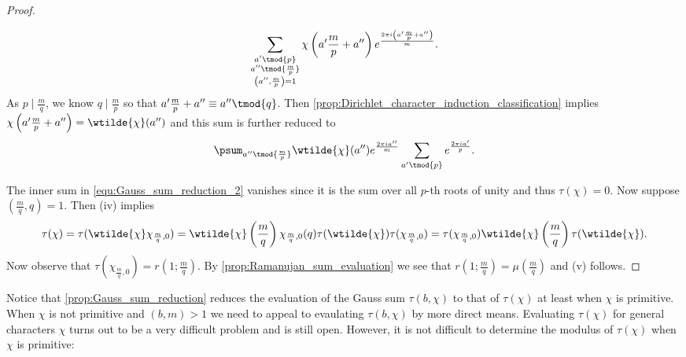 \begin{proof}
\begin{enumerate}[label=(\roman*)]
\[              \sum_{\substack{a' \tmod{p} \\ a'' \tmod{\frac{m}{p}} \\ \left(a'',\frac{m}{p}\right) = 1}}\chi\left(a'\frac{m}{p}+a''\right)e^{\frac{2\pi i\left(a'\frac{m}{p}+a''\right)}{m}}.
            \]
            As $p \mid \frac{m}{q}$, we know $q \mid \frac{m}{p}$ so that $a'\frac{m}{p}+a'' \equiv a'' \tmod{q}$. Then \cref{prop:Dirichlet_character_induction_classification} implies $\chi\left(a'\frac{m}{p}+a''\right) = \wtilde{\chi}(a'')$ and this sum is further reduced to
            \begin{equation}\label{equ:Gauss_sum_reduction_2}
              \psum_{a'' \tmod{\frac{m}{p}}}\wtilde{\chi}(a'')e^{\frac{2\pi ia''}{m}}\sum_{a' \tmod{p}}e^{\frac{2\pi ia'}{p}}.
            \end{equation}
          \end{enumerate}
          The inner sum in \cref{equ:Gauss_sum_reduction_2} vanishes since it is the sum over all $p$-th roots of unity and thus $\tau(\chi) = 0$. Now suppose $\left(\frac{m}{q},q\right) = 1$. Then (iv) implies
          \[
            \tau(\chi) = \tau(\wtilde{\chi}\chi_{\frac{m}{q},0}) = \wtilde{\chi}\left(\frac{m}{q}\right)\chi_{\frac{m}{q},0}(q)\tau(\wtilde{\chi})\tau(\chi_{\frac{m}{q},0}) = \tau(\chi_{\frac{m}{q},0})\wtilde{\chi}\left(\frac{m}{q}\right)\tau(\wtilde{\chi}).
          \]
          Now observe that $\tau(\chi_{\frac{m}{q},0}) = r\left(1;\frac{m}{q}\right)$. By \cref{prop:Ramanujan_sum_evaluation} we see that $r\left(1;\frac{m}{q}\right) = \mu\left(\frac{m}{q}\right)$ and (v) follows.
        \end{proof}

        Notice that \cref{prop:Gauss_sum_reduction} reduces the evaluation of the Gauss sum $\tau(b,\chi)$ to that of $\tau(\chi)$ at least when $\chi$ is primitive. When $\chi$ is not primitive and $(b,m) > 1$ we need to appeal to evaulating $\tau(b,\chi)$ by more direct means. Evaluating $\tau(\chi)$ for general characters $\chi$ turns out to be a very difficult problem and is still open. However, it is not difficult to determine the modulus of $\tau(\chi)$ when $\chi$ is primitive:

